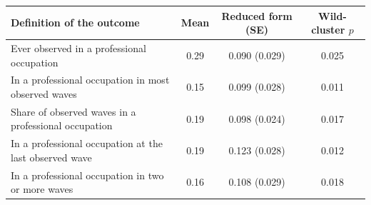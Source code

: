\begin{tabular}{@{}p{8.2cm}ccc@{}}
\toprule
Definition of the outcome & Mean & Reduced form (SE) & Wild-cluster $p$ \\
\midrule
Ever observed in a professional occupation & 0.29 & 0.090 (0.029) & 0.025 \\
In a professional occupation in most observed waves & 0.15 & 0.099 (0.028) & 0.011 \\
Share of observed waves in a professional occupation & 0.19 & 0.098 (0.024) & 0.017 \\
In a professional occupation at the last observed wave & 0.19 & 0.123 (0.028) & 0.012 \\
In a professional occupation in two or more waves & 0.16 & 0.108 (0.029) & 0.018 \\
\bottomrule
\end{tabular}
